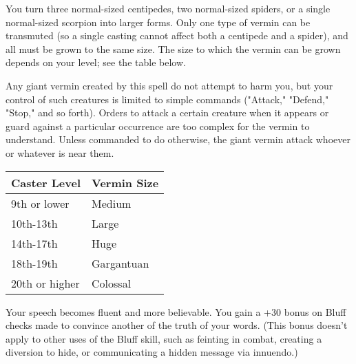 \begin{multicols}{2}
\begin{small}

\noindent You turn three normal-sized centipedes, two normal-sized spiders, or a single normal-sized scorpion into larger forms. Only one type of vermin can be transmuted (so a single casting cannot affect both a centipede and a spider), and all must be grown to the same size. The size to which the vermin can be grown depends on your level; see the table below.

\smallskip\noindent Any giant vermin created by this spell do not attempt to harm you, but your control of such creatures is limited to simple commands ("Attack," "Defend," "Stop," and so forth). Orders to attack a certain creature when it appears or guard against a particular occurrence are too complex for the vermin to understand. Unless commanded to do otherwise, the giant vermin attack whoever or whatever is near them.

\begin{center}
\begin{tabular}[h!]{l|l}
Caster Level & Vermin Size \\ \hline
9th or lower & Medium \\
10th-13th & Large \\
14th-17th & Huge \\
18th-19th & Gargantuan \\
20th or higher & Colossal \\
\end{tabular}
\end{center}

\noindent Your speech becomes fluent and more believable. You gain a +30 bonus on Bluff checks made to convince another of the truth of your words. (This bonus doesn't apply to other uses of the Bluff skill, such as feinting in combat, creating a diversion to hide, or communicating a hidden message via innuendo.)


\end{small}
\end{multicols}
